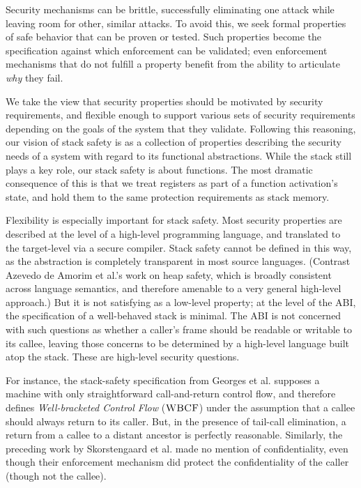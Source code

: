 \documentclass[10pt,conference]{ieeetran}%
\theoremstyle{definition}
\begin{document}
Security mechanisms can be brittle, successfully eliminating one attack while leaving room for
other, similar attacks. To avoid this, we seek formal properties of safe behavior that can be proven
or tested. Such properties become the specification against which enforcement can be validated;
even enforcement mechanisms that do not fulfill a property benefit from the ability to articulate
\emph{why} they fail.

We take the view that security properties should be motivated by security requirements,
and flexible enough to support various sets of security requirements depending on the
goals of the system that they validate.
Following this reasoning, our vision of stack safety is as a collection of properties
describing the security needs of a system with regard to its functional abstractions.
While the stack still plays a key role, our stack safety is about functions. The most
dramatic consequence of this is that we treat registers as part of a function activation's
state, and hold them to the same protection requirements as stack memory.

Flexibility is especially important for stack safety.
%
Most security properties are described at the level of a high-level programming language,
and translated to the target-level via a secure compiler. Stack safety cannot
be defined in this way, as the abstraction is completely transparent in most source languages.
(Contrast Azevedo de Amorim et al.'s \cite{DBLP:conf/post/AmorimHP18} work on heap safety,
which is broadly consistent across language semantics, and therefore
amenable to a very general high-level approach.)
%
But it is not satisfying as a low-level property; at the level of the ABI, the
specification of a well-behaved stack is minimal. The ABI is not concerned with such
questions as whether a caller's frame should be readable or writable to its callee,
leaving those concerns to be determined by a high-level language built atop the stack.
These are high-level security questions.

For instance, the stack-safety specification from Georges et al.
\cite{Georges22:TempsDesCerises} supposes a machine with only straightforward call-and-return
control flow, and therefore defines {\em Well-bracketed Control Flow} (\(\textnormal{\sc WBCF}\)) under the assumption that
a callee should always return to its caller. But, in the presence of tail-call elimination, a
return from a callee to a distant ancestor is perfectly reasonable. Similarly, the preceding work by
Skorstengaard et al. \cite{SkorstengaardSTKJFP} made no mention of confidentiality, even though
their enforcement mechanism did protect the confidentiality of the caller (though not the callee).
\end{document}
